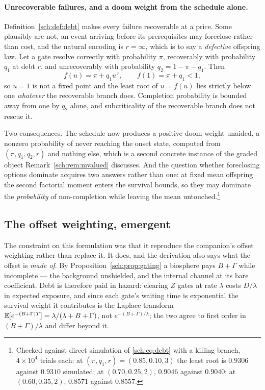 \paragraph{Unrecoverable failures, and a doom weight from the
schedule alone.}\label{sch:rem:defective}
Definition~\ref{sch:def:debt} makes every failure recoverable at a
price. Some plausibly are not, an event arriving before its
prerequisites may foreclose rather than cost, and the natural
encoding is $r=\infty$, which is to say a \emph{defective} offspring
law. Let a gate resolve correctly with probability $\pi$, recoverably
with probability $q_1$ at debt $r$, and unrecoverably with probability
$q_2=1-\pi-q_1$. Then
\begin{equation}\label{sch:eq:defective}
f(u)=\pi+q_1u^{\,r},\qquad f(1)=\pi+q_1<1,
\end{equation}
so $u=1$ is not a fixed point and the least root of $u=f(u)$ lies
strictly below one \emph{whatever} the recoverable branch does.
Completion probability is bounded away from one by $q_2$ alone, and
subcriticality of the recoverable branch does not rescue it.

Two consequences. The schedule now produces a positive doom weight
unaided, a nonzero probability of never reaching the onset state,
computed from $(\pi,q_1,q_2,r)$ and nothing else, which is a second
concrete instance of the graded object
Remark~\ref{sch:rem:mvalued} discusses. And the question whether
foreclosing options dominate acquires two answers rather than one: at
fixed mean offspring the second factorial moment enters the survival
bounds, so they may dominate the \emph{probability} of non-completion
while leaving the mean untouched.\footnote{Checked
against direct simulation of \eqref{sch:eq:debt} with a killing branch,
$4\times10^{4}$ trials each: at $(\pi,q_1,r)=(0.85,0.10,3)$ the least
root is $0.9306$ against $0.9310$ simulated; at $(0.70,0.25,2)$,
$0.9046$ against $0.9040$; at $(0.60,0.35,2)$, $0.8571$ against
$0.8557$.}

\subsection{The offset weighting, emergent}\label{sch:subsub:emergent}

The constraint on this formulation was that it reproduce the companion's
offset weighting rather than replace it. It does, and the derivation
also says what the offset is \emph{made of}. By Proposition~\ref{sch:prop:gating} a biosphere pays $B+\Gamma$ while
incomplete --- the background unshielded, and the internal channel at its
bare coefficient. Debt is therefore paid in hazard: clearing $Z$ gates at
rate $\lambda$ costs $D/\lambda$ in expected exposure, and since each
gate's waiting time is exponential the survival weight it contributes
is the Laplace transform $\mathbb{E}[e^{-(B+\Gamma)T}]=\lambda/(\lambda+B+\Gamma)$,
not $e^{-(B+\Gamma)/\lambda}$; the two agree to first order in
$(B+\Gamma)/\lambda$ and differ beyond it.

